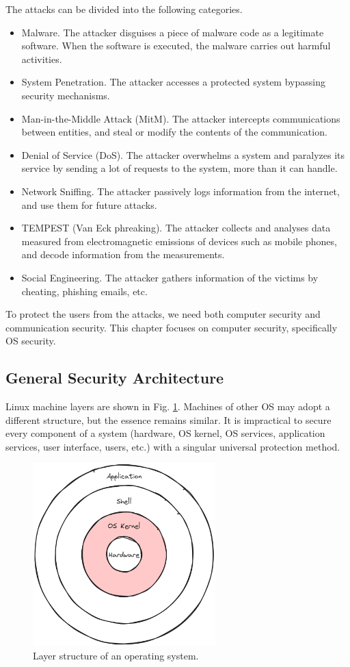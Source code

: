 The attacks can be divided into the following categories.
\begin{itemize}
	\item Malware. The attacker disguises a piece of malware code as a legitimate software. When the software is executed, the malware carries out harmful activities.
	\item System Penetration. The attacker accesses a protected system bypassing security mechanisms.
	\item Man-in-the-Middle Attack (MitM). The attacker intercepts communications between entities, and steal or modify the contents of the communication.
	\item Denial of Service (DoS). The attacker overwhelms a system and paralyzes its service by sending a lot of requests to the system, more than it can handle.
	\item Network Sniffing. The attacker passively logs information from the internet, and use them for future attacks.
	\item TEMPEST (Van Eck phreaking). The attacker collects and analyses data measured from electromagnetic emissions of devices such as mobile phones, and decode information from the measurements.
	\item Social Engineering. The attacker gathers information of the victims by cheating, phishing emails, etc.
\end{itemize}

To protect the users from the attacks, we need both computer security and communication security. This chapter focuses on computer security, specifically OS security.

\subsection{General Security Architecture}

Linux machine layers are shown in Fig. \ref{ch:ossec:fig:layerstructure}. Machines of other OS may adopt a different structure, but the essence remains similar. It is impractical to secure every component of a system (hardware, OS kernel, OS services, application services, user interface, users, etc.) with a singular universal protection method.

\begin{figure}[htbp]
	\centering
	\includegraphics[width=200pt]{chapters/ch-computer-security-basics/figures/os_layer.png}
	\caption{Layer structure of an operating system.} \label{ch:ossec:fig:layerstructure}
\end{figure}

